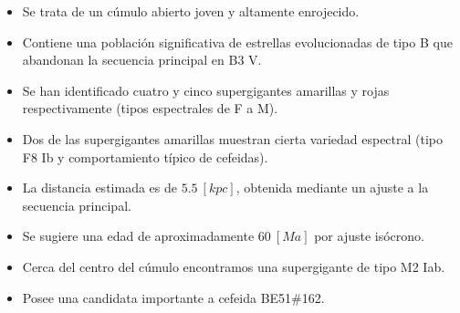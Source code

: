 \documentclass[a4paper,fleqn,usenatbib]{mnras}
\begin{document}
\begin{itemize}
  \item Se trata de un cúmulo abierto joven y altamente enrojecido. 
  \item Contiene una población significativa de estrellas evolucionadas de tipo B que abandonan la secuencia principal en B3 V.
  \item Se han identificado cuatro y cinco supergigantes amarillas y rojas respectivamente (tipos espectrales de F a M).
  \item Dos de las supergigantes amarillas muestran cierta variedad espectral (tipo F8 Ib y comportamiento típico de cefeidas).
  \item La distancia estimada es de $5.5~[kpc]$, obtenida mediante un ajuste a la secuencia principal.
  \item Se sugiere una edad de aproximadamente $60~[Ma]$ por ajuste isócrono.
  \item Cerca del centro del cúmulo encontramos una supergigante de tipo M2 Iab.
  \item Posee una candidata importante a cefeida BE51\#162.
\end{itemize}
\end{document}
